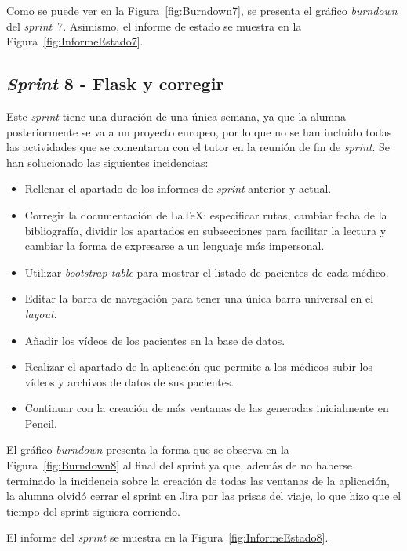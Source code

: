 Como se puede ver en la Figura~\ref{fig:Burndown7}, se presenta el gráfico \textit{burndown} del \textit{sprint}~7. Asimismo, el informe de estado se muestra en la Figura~\ref{fig:InformeEstado7}.




\subsection{\textit{Sprint} 8 - Flask y corregir}
Este \textit{sprint} tiene una duración de una única semana, ya que la alumna posteriormente se va a un proyecto europeo, por lo que no se han incluido todas las actividades que se comentaron con el tutor en la reunión de fin de \textit{sprint}. Se han solucionado las siguientes incidencias:
\begin{itemize}
    \item Rellenar el apartado de los informes de \textit{sprint} anterior y actual.
    \item Corregir la documentación de \LaTeX{}: especificar rutas, cambiar fecha de la bibliografía, dividir los apartados en subsecciones para facilitar la lectura y cambiar la forma de expresarse a un lenguaje más impersonal.
    \item Utilizar \textit{bootstrap-table} para mostrar el listado de pacientes de cada médico.
    \item Editar la barra de navegación para tener una única barra universal en el \textit{layout}.
    \item Añadir los vídeos de los pacientes en la base de datos.
    \item Realizar el apartado de la aplicación que permite a los médicos subir los vídeos y archivos de datos de sus pacientes.
    \item Continuar con la creación de más ventanas de las generadas inicialmente en Pencil.
\end{itemize}

El gráfico \textit{burndown} presenta la forma que se observa en la Figura~\ref{fig:Burndown8} al final del sprint ya que, además de no haberse terminado la incidencia sobre la creación de todas las ventanas de la aplicación, la alumna olvidó cerrar el sprint en Jira por las prisas del viaje, lo que hizo que el tiempo del sprint siguiera corriendo.

El informe del \textit{sprint} se muestra en la Figura~\ref{fig:InformeEstado8}.




